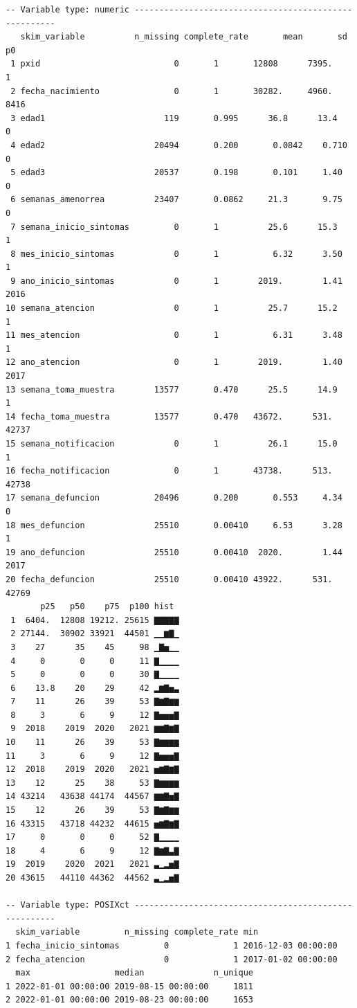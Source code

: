 \documentclass[
  letterpaper,
  DIV=11,
  numbers=noendperiod]{scrreprt}
\begin{document}
\begin{verbatim}
-- Variable type: numeric ------------------------------------------------------
   skim_variable          n_missing complete_rate       mean       sd    p0
 1 pxid                           0       1       12808      7395.        1
 2 fecha_nacimiento               0       1       30282.     4960.     8416
 3 edad1                        119       0.995      36.8      13.4       0
 4 edad2                      20494       0.200       0.0842    0.710     0
 5 edad3                      20537       0.198       0.101     1.40      0
 6 semanas_amenorrea          23407       0.0862     21.3       9.75      0
 7 semana_inicio_sintomas         0       1          25.6      15.3       1
 8 mes_inicio_sintomas            0       1           6.32      3.50      1
 9 ano_inicio_sintomas            0       1        2019.        1.41   2016
10 semana_atencion                0       1          25.7      15.2       1
11 mes_atencion                   0       1           6.31      3.48      1
12 ano_atencion                   0       1        2019.        1.40   2017
13 semana_toma_muestra        13577       0.470      25.5      14.9       1
14 fecha_toma_muestra         13577       0.470   43672.      531.    42737
15 semana_notificacion            0       1          26.1      15.0       1
16 fecha_notificacion             0       1       43738.      513.    42738
17 semana_defuncion           20496       0.200       0.553     4.34      0
18 mes_defuncion              25510       0.00410     6.53      3.28      1
19 ano_defuncion              25510       0.00410  2020.        1.44   2017
20 fecha_defuncion            25510       0.00410 43922.      531.    42769
       p25   p50    p75  p100 hist 
 1  6404.  12808 19212. 25615 ▇▇▇▇▇
 2 27144.  30902 33921  44501 ▁▁▆▇▁
 3    27      35    45     98 ▁▇▅▁▁
 4     0       0     0     11 ▇▁▁▁▁
 5     0       0     0     30 ▇▁▁▁▁
 6    13.8    20    29     42 ▂▆▇▅▃
 7    11      26    39     53 ▇▆▇▆▆
 8     3       6     9     12 ▇▅▅▅▇
 9  2018    2019  2020   2021 ▆▆▇▆▇
10    11      26    39     53 ▇▆▆▆▆
11     3       6     9     12 ▇▅▅▅▇
12  2018    2019  2020   2021 ▅▆▇▆▇
13    12      25    38     53 ▇▆▆▆▆
14 43214   43638 44174  44567 ▆▆▇▅▇
15    12      26    39     53 ▇▆▇▆▆
16 43315   43718 44232  44615 ▅▆▇▆▇
17     0       0     0     52 ▇▁▁▁▁
18     4       6     9     12 ▇▆▇▃▇
19  2019    2020  2021   2021 ▃▁▂▅▇
20 43615   44110 44362  44562 ▃▁▂▅▇

-- Variable type: POSIXct ------------------------------------------------------
  skim_variable         n_missing complete_rate min                
1 fecha_inicio_sintomas         0             1 2016-12-03 00:00:00
2 fecha_atencion                0             1 2017-01-02 00:00:00
  max                 median              n_unique
1 2022-01-01 00:00:00 2019-08-15 00:00:00     1811
2 2022-01-01 00:00:00 2019-08-23 00:00:00     1653
\end{verbatim}
\end{document}
